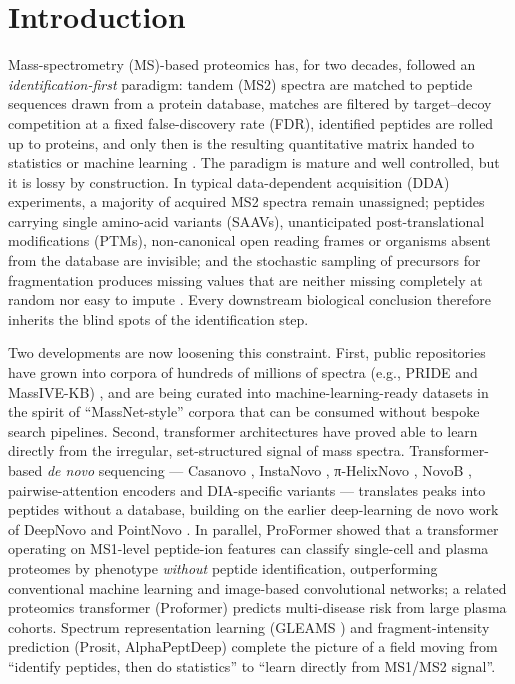 \documentclass[pdflatex,sn-mathphys-num]{sn-jnl}
\begin{document}
\section{Introduction}\label{sec:intro}
Mass-spectrometry (MS)-based proteomics has, for two decades, followed an \emph{identification-first} paradigm: tandem (MS2) spectra are matched to peptide sequences drawn from a protein database, matches are filtered by target--decoy competition at a fixed false-discovery rate (FDR), identified peptides are rolled up to proteins, and only then is the resulting quantitative matrix handed to statistics or machine learning \cite{aebersold2016,cox2008,elias2007}. The paradigm is mature and well controlled, but it is lossy by construction. In typical data-dependent acquisition (DDA) experiments, a majority of acquired MS2 spectra remain unassigned; peptides carrying single amino-acid variants (SAAVs), unanticipated post-translational modifications (PTMs), non-canonical open reading frames or organisms absent from the database are invisible; and the stochastic sampling of precursors for fragmentation produces missing values that are neither missing completely at random nor easy to impute \cite{lazar2016,mann2021}. Every downstream biological conclusion therefore inherits the blind spots of the identification step.

Two developments are now loosening this constraint. First, public repositories have grown into corpora of hundreds of millions of spectra (e.g., PRIDE and MassIVE-KB) \cite{perez2022,wang2018}, and are being curated into machine-learning-ready datasets in the spirit of ``MassNet-style'' corpora that can be consumed without bespoke search pipelines. Second, transformer architectures \cite{vaswani2017} have proved able to learn directly from the irregular, set-structured signal of mass spectra. Transformer-based \emph{de novo} sequencing --- Casanovo \cite{yilmaz2024}, InstaNovo \cite{eloff2025}, π-HelixNovo \cite{yang2024}, NovoB \cite{lee2024}, pairwise-attention encoders \cite{lapin2025} and DIA-specific variants \cite{ebrahimi2023} --- translates peaks into peptides without a database, building on the earlier deep-learning de novo work of DeepNovo \cite{tran2017} and PointNovo \cite{qiao2021}. In parallel, ProFormer \cite{krull2026} showed that a transformer operating on MS1-level peptide-ion features can classify single-cell and plasma proteomes by phenotype \emph{without} peptide identification, outperforming conventional machine learning and image-based convolutional networks; a related proteomics transformer (Proformer) \cite{qiu2025} predicts multi-disease risk from large plasma cohorts. Spectrum representation learning (GLEAMS \cite{bittremieux2022}) and fragment-intensity prediction (Prosit, AlphaPeptDeep) \cite{gessulat2019,zeng2022} complete the picture of a field moving from ``identify peptides, then do statistics'' to ``learn directly from MS1/MS2 signal''.
\end{document}
